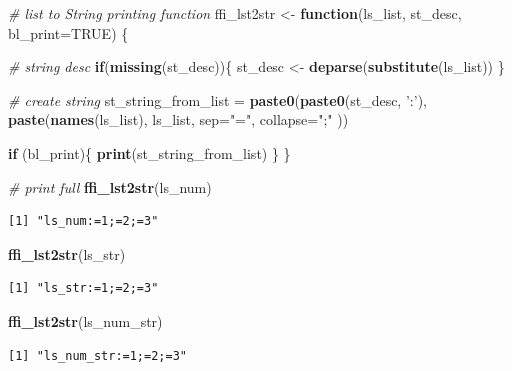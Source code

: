 \documentclass[
]{book}
\newenvironment{Shaded}{\begin{snugshade}}{\end{snugshade}}
\newcommand{\CommentTok}[1]{\textcolor[rgb]{0.56,0.35,0.01}{\textit{#1}}}
\newcommand{\ControlFlowTok}[1]{\textcolor[rgb]{0.13,0.29,0.53}{\textbf{#1}}}
\newcommand{\DataTypeTok}[1]{\textcolor[rgb]{0.13,0.29,0.53}{#1}}
\newcommand{\KeywordTok}[1]{\textcolor[rgb]{0.13,0.29,0.53}{\textbf{#1}}}
\newcommand{\NormalTok}[1]{#1}
\newcommand{\OtherTok}[1]{\textcolor[rgb]{0.56,0.35,0.01}{#1}}
\newcommand{\StringTok}[1]{\textcolor[rgb]{0.31,0.60,0.02}{#1}}
\begin{document}
\begin{Shaded}
\begin{Highlighting}[]
\CommentTok{# list to String printing function}
\NormalTok{ffi_lst2str <-}\StringTok{ }\ControlFlowTok{function}\NormalTok{(ls_list, st_desc, }\DataTypeTok{bl_print=}\OtherTok{TRUE}\NormalTok{) \{}
  
  \CommentTok{# string desc}
  \ControlFlowTok{if}\NormalTok{(}\KeywordTok{missing}\NormalTok{(st_desc))\{}
\NormalTok{    st_desc <-}\StringTok{ }\KeywordTok{deparse}\NormalTok{(}\KeywordTok{substitute}\NormalTok{(ls_list))}
\NormalTok{  \}}
    
  \CommentTok{# create string}
\NormalTok{  st_string_from_list =}\StringTok{ }\KeywordTok{paste0}\NormalTok{(}\KeywordTok{paste0}\NormalTok{(st_desc, }\StringTok{':'}\NormalTok{), }
                               \KeywordTok{paste}\NormalTok{(}\KeywordTok{names}\NormalTok{(ls_list), ls_list, }\DataTypeTok{sep=}\StringTok{"="}\NormalTok{, }\DataTypeTok{collapse=}\StringTok{";"}\NormalTok{ ))}
  
  \ControlFlowTok{if}\NormalTok{ (bl_print)\{}
    \KeywordTok{print}\NormalTok{(st_string_from_list)}
\NormalTok{  \}}
\NormalTok{\}}

\CommentTok{# print full}
\KeywordTok{ffi_lst2str}\NormalTok{(ls_num)}
\end{Highlighting}
\end{Shaded}

\begin{verbatim}
[1] "ls_num:=1;=2;=3"
\end{verbatim}

\begin{Shaded}
\begin{Highlighting}[]
\KeywordTok{ffi_lst2str}\NormalTok{(ls_str)}
\end{Highlighting}
\end{Shaded}

\begin{verbatim}
[1] "ls_str:=1;=2;=3"
\end{verbatim}

\begin{Shaded}
\begin{Highlighting}[]
\KeywordTok{ffi_lst2str}\NormalTok{(ls_num_str)}
\end{Highlighting}
\end{Shaded}

\begin{verbatim}
[1] "ls_num_str:=1;=2;=3"
\end{verbatim}
\end{document}
